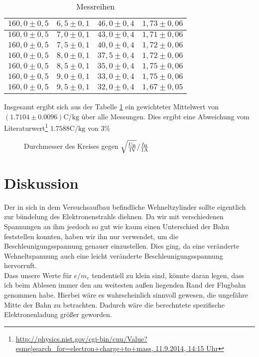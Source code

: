 \documentclass[12pt,a4paper,titlepage,headinclude,bibtotoc]{scrartcl}
\numberwithin{equation}{section}
\begin{document}
\begin{table}[h!]
\begin{tabular}{|c|c|c|c|}
		 \hline                         
		 $160,0 \pm 0,5$ & $6,5 \pm 0,1$& $46,0 \pm 0,4$ & $1,73 \pm 0,06$\\
		 \hline                         
		 $160,0 \pm 0,5$ & $7,0 \pm 0,1$& $43,0 \pm 0,4$ & $1,71 \pm 0,06$\\
		 \hline                         
		 $160,0 \pm 0,5$ & $7,5 \pm 0,1$& $40,0 \pm 0,4$ & $1,72 \pm 0,06$\\
		 \hline                         
		 $160,0 \pm 0,5$ & $8,0 \pm 0,1$& $37,5 \pm 0,4$ & $1,72 \pm 0,06$\\
		 \hline                         
		 $160,0 \pm 0,5$ & $8,5 \pm 0,1$& $35,0 \pm 0,4$ & $1,75 \pm 0,06$\\
		 \hline                         
		 $160,0 \pm 0,5$ & $9,0 \pm 0,1$& $33,0 \pm 0,4$ & $1,75 \pm 0,06$\\
		 \hline                         
		 $160,0 \pm 0,5$ & $9,5 \pm 0,1$& $32,0 \pm 0,4$ & $1,67 \pm 0,05$\\
		  \hline
	  \end{tabular}
	  \caption{Messreihen}
	  \label{tbl:pythonmessung}
  \end{table}
Insgesamt ergibt sich aus der Tabelle \ref{tbl:pythonmessung} ein gewichteter Mittelwert von $(1.7104 \pm 0.0096)\si{\coulomb/\kilo\gram}$ über alle Messungen.
Dies ergibt eine Abweichung vom Literaturwert\footnote{\url{http://physics.nist.gov/cgi-bin/cuu/Value?esme|search_for=electron+charge+to+mass, 11.9.2014, 14:15 Uhr}} $1.7588\si{\coulomb/\kilo\gram}$ von $3\%$

\begin{figure}[!h]
	\centering
	
	\caption{Durchmesser des Kreises gegen $\sqrt{\frac{U_\text{B}}{1\text V}}/\frac{I_\text{H}}{1\text A}$}
	\label{fig:eric}
\end{figure}


\section{Diskussion}
\label{sec:diskussion}
Der in sich in dem Versuchsaufbau befindliche Wehneltzylinder sollte eigentlich zur bündelung des Elektronenstrahls diehnen.
Da wir mit verschiedenen Spannungen an ihm jeedoch so gut wie kaum einen Unterschied der Bahn feststellen konnten, haben wir ihn nur verwendet, um die Beschleunigungsspannung genauer einzustellen.
Dies ging, da eine veränderte Wehneltspannung auch eine leicht veränderte Beschleunigungsspannung hervorruft.\\
Dass unsere Werte für $e/m_e$ tendentiell zu klein sind, könnte daran legen, dass ich beim Ablesen immer den am weitesten außen liegenden Rand der Flugbahn genommen habe.
Hierbei wäre es wahrscheinlich sinnvoll gewesen, die ungefähre Mitte der Bahn zu betrachten.
Dadurch wäre die berechntete spezifische Elektronenladung größer geworden.




\end{document}
